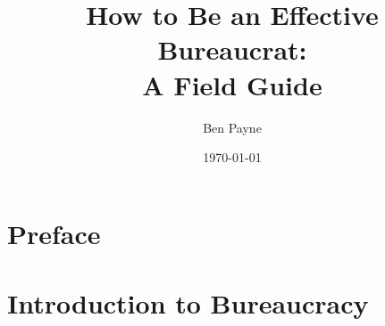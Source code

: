 \documentclass{book}
\title{How to Be an Effective Bureaucrat:\\
A Field Guide}
\author{Ben Payne}
\date{\today}
\begin{document}





\begin{titlepage}
\maketitle
\thispagestyle{empty}
\end{titlepage}
\clearpage

\frontmatter %

\clearpage

\hypertarget{contents}{}
\tableofcontents

\chapter{Preface}
\clearpage

\mainmatter %


\chapter{Introduction to Bureaucracy}

  
  
\end{document}
